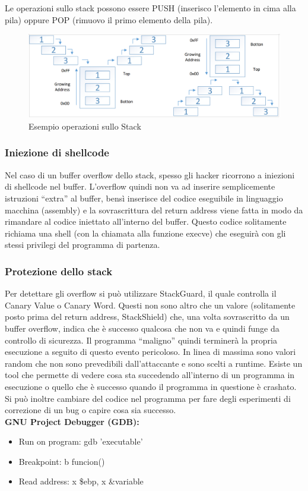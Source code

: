 \documentclass{article}
\begin{document}
Le operazioni sullo stack possono essere PUSH (inserisco l’elemento in cima alla pila) 
oppure POP (rimuovo il primo elemento della pila). 
\begin{figure}[H]
    \center
    \includegraphics[scale=0.2]{images/BO5.png}
    \caption{Esempio operazioni sullo Stack}\label{fig:1}
\end{figure}
\subsubsection{Iniezione di shellcode}
Nel caso di un buffer overflow dello stack, spesso gli hacker ricorrono a iniezioni di shellcode nel buffer. 
L’overflow quindi non va ad inserire semplicemente istruzioni “extra” al buffer, bensì inserisce del codice 
eseguibile in linguaggio macchina (assembly) e la sovrascrittura del return address viene fatta in modo da 
rimandare al codice iniettato all’interno del buffer. Questo codice solitamente richiama una shell (con la 
chiamata alla funzione execve) che eseguirà con gli stessi privilegi del programma di partenza. 
\subsubsection{Protezione dello stack}
Per detettare gli overflow si può utilizzare StackGuard, il quale controlla il Canary Value o Canary Word. 
Questi non sono altro che un valore (solitamente posto prima del return address, StackShield) che, una volta 
sovrascritto da un buffer overflow, indica che è successo qualcosa che non va e quindi funge da controllo di 
sicurezza. Il programma “maligno” quindi terminerà la propria esecuzione a seguito di questo evento pericoloso. 
In linea di massima sono valori random che non sono prevedibili dall’attaccante e sono scelti a runtime. 
Esiste un tool che permette di vedere cosa sta succedendo all’interno di un programma in esecuzione o quello 
che è successo quando il programma in questione è crashato. Si può inoltre cambiare del codice nel programma 
per fare degli esperimenti di correzione di un bug o capire cosa sia successo. \\
\textbf{GNU Project Debugger (GDB):}
\begin{itemize}
    \item Run on program: gdb 'executable'
    \item Breakpoint: b funcion()
    \item Read address: x \$ebp, x \&variable
\end{itemize}
\end{document}
